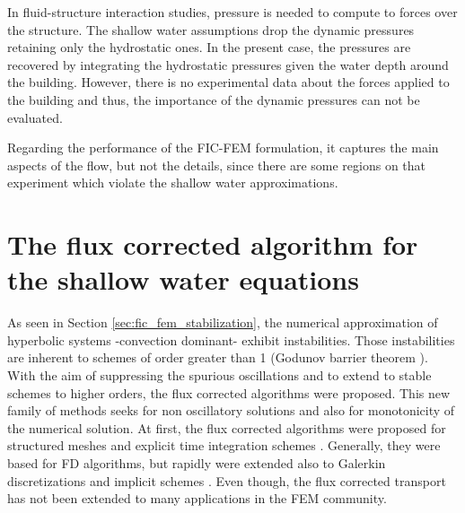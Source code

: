 In fluid-structure interaction studies, pressure is needed to compute to forces over the structure. The shallow water assumptions drop the dynamic pressures retaining only the hydrostatic ones. In the present case, the pressures are recovered by integrating the hydrostatic pressures given the water depth around the building. However, there is no experimental data about the forces applied to the building and thus, the importance of the dynamic pressures can not be evaluated.


Regarding the performance of the FIC-FEM formulation, it captures the main aspects of the flow, but not the details, since there are some regions on that experiment which violate the shallow water approximations.










\section{The flux corrected algorithm for the shallow water equations}
\label{sec:sw_fc}



As seen in Section \ref{sec:fic_fem_stabilization}, the numerical approximation of hyperbolic systems -convection dominant- exhibit instabilities. Those instabilities are inherent to schemes of order greater than 1 (Godunov barrier theorem \cite{godunov1959}). With the aim of suppressing the spurious oscillations and to extend to stable schemes to higher orders, the flux corrected algorithms were proposed.
This new family of methods seeks for non oscillatory solutions and also for monotonicity of the numerical solution. At first, the flux corrected algorithms were proposed for structured meshes and explicit time integration schemes \cite{boris1973, book1975}. Generally, they were based for FD algorithms, but rapidly were extended also to Galerkin discretizations and implicit schemes \cite{kuzmin2001, lohner2008ch9}. Even though, the flux corrected transport has not been extended to many applications in the FEM community.


